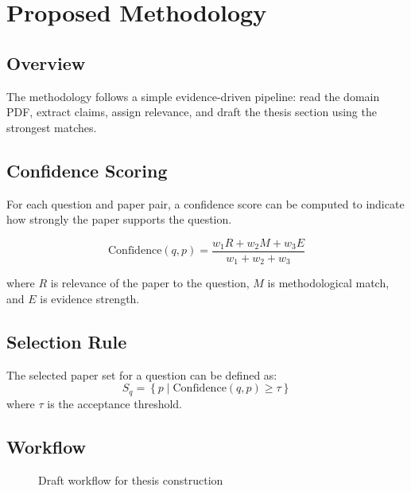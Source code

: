 \documentclass[12pt,a4paper,oneside]{book}
\begin{document}
\chapter{Proposed Methodology}

\section{Overview}
The methodology follows a simple evidence-driven pipeline: read the domain PDF, extract claims, assign relevance, and draft the thesis section using the strongest matches.

\section{Confidence Scoring}
For each question and paper pair, a confidence score can be computed to indicate how strongly the paper supports the question.

\begin{equation}
\mathrm{Confidence}(q,p) = \frac{w_1 R + w_2 M + w_3 E}{w_1 + w_2 + w_3}
\end{equation}

where $R$ is relevance of the paper to the question, $M$ is methodological match, and $E$ is evidence strength.

\section{Selection Rule}
The selected paper set for a question can be defined as:
\begin{equation}
S_q = \left\{p \mid \mathrm{Confidence}(q,p) \geq \tau \right\}
\end{equation}
where $\tau$ is the acceptance threshold.

\section{Workflow}
\begin{figure}[H]
\centering
{}
\caption{Draft workflow for thesis construction}
\end{figure}
\end{document}
